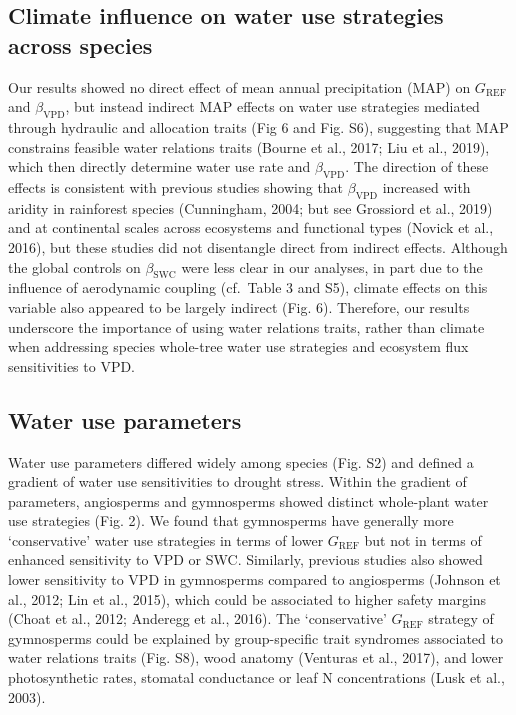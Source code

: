 \documentclass[11pt,twoside]{reedthesis}
\begin{document}
\subsection{Climate influence on water use strategies across
species}\label{climate-influence-on-water-use-strategies-across-species}

Our results showed no direct effect of mean annual precipitation (MAP)
on \(G_{\text{REF}}\) and \(\beta_{\text{VPD}}\), but instead indirect
MAP effects on water use strategies mediated through hydraulic and
allocation traits (Fig 6 and Fig. S6), suggesting that MAP constrains
feasible water relations traits (Bourne et al., 2017; Liu et al., 2019),
which then directly determine water use rate and \(\beta_{\text{VPD}}\).
The direction of these effects is consistent with previous studies
showing that \(\beta_{\text{VPD}}\) increased with aridity in rainforest
species (Cunningham, 2004; but see Grossiord et al., 2019) and at
continental scales across ecosystems and functional types (Novick et
al., 2016), but these studies did not disentangle direct from indirect
effects. Although the global controls on \(\beta_{\text{SWC}}\) were
less clear in our analyses, in part due to the influence of aerodynamic
coupling (cf.~Table 3 and S5), climate effects on this variable also
appeared to be largely indirect (Fig. 6). Therefore, our results
underscore the importance of using water relations traits, rather than
climate when addressing species whole-tree water use strategies and
ecosystem flux sensitivities to VPD.\par

\subsection{Water use parameters}\label{water-use-parameters}

Water use parameters differed widely among species (Fig. S2) and defined
a gradient of water use sensitivities to drought stress. Within the
gradient of parameters, angiosperms and gymnosperms showed distinct
whole-plant water use strategies (Fig. 2). We found that gymnosperms
have generally more `conservative' water use strategies in terms of
lower \(G_{\text{REF}}\) but not in terms of enhanced sensitivity to VPD
or SWC. Similarly, previous studies also showed lower sensitivity to VPD
in gymnosperms compared to angiosperms (Johnson et al., 2012; Lin et
al., 2015), which could be associated to higher safety margins (Choat et
al., 2012; Anderegg et al., 2016). The `conservative' \(G_{\text{REF}}\)
strategy of gymnosperms could be explained by group-specific trait
syndromes associated to water relations traits (Fig. S8), wood anatomy
(Venturas et al., 2017), and lower photosynthetic rates, stomatal
conductance or leaf N concentrations (Lusk et al., 2003).\par
\end{document}
